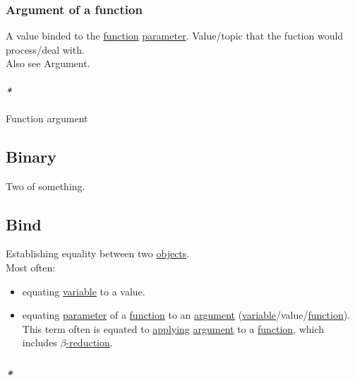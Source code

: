 \documentclass[11pt]{article}
\begin{document}
\subsubsection{\label{org7740e22}Argument of a function}
\label{sec:orga352c41}
A value binded to the \hyperref[orgeb5cddb]{function} \hyperref[org45d4a16]{parameter}. Value/topic that the fuction would process/deal with.\\

Also see \label{orgd4586df}Argument.\\

\paragraph{\emph{*}}
\label{sec:orga31f457}

\label{org29336a8}Function argument\\

\subsection{\label{orgee106ab}Binary}
\label{sec:org865ed32}
Two of something.\\

\subsection{\label{org8b7f62c}Bind}
\label{sec:org8861986}
Establishing equality between two \hyperref[orge0f000f]{objects}.\\

Most often:\\
\begin{itemize}
\item equating \hyperref[org301bab5]{variable} to a value.\\
\item equating \hyperref[org45d4a16]{parameter} of a \hyperref[orgeb5cddb]{function} to an \hyperref[orgf66a5f7]{argument} (\hyperref[org301bab5]{variable}/value/\hyperref[orgeb5cddb]{function}). This term often is equated to \hyperref[orgc54ef49]{applying} \hyperref[orgf66a5f7]{argument} to a \hyperref[orgeb5cddb]{function}, which includes \hyperref[orgf583adb]{\(\beta\)-reduction}.\\
\end{itemize}

\subsubsection{\emph{*}}
\label{sec:orgd125569}
\end{document}
